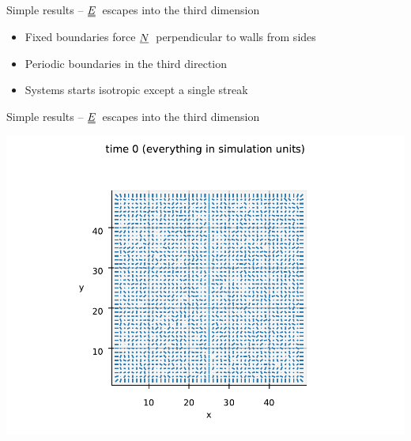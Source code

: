 \documentclass[10pt,mathserif]{beamer}
\newcommand{\suf}[2]{\stackunder[0.5pt]{\stackunder[1pt]{\ensuremath{#1}}{\rule{\widthof{\ensuremath{#2}}*\real{0.9}}{.1ex}}}{}}
\newcommand{\duf}[2]{\stackunder[0.5pt]{\stackunder[0.8pt]{\stackunder[1pt]{\ensuremath{#1}}{\rule{\widthof{\ensuremath{#2}}*\real{0.9}}{.1ex}}}{\rule{\widthof{\ensuremath{#2}}*\real{0.9}}{.1ex}}}{}}
\newcommand{\su}[1]{\suf{#1}{#1}}
\newcommand{\du}[1]{\duf{#1}{#1}}
\newcommand{\NN}{\ensuremath{\su{N}}}
\newcommand{\EE}{\ensuremath{\du{E}}}
\begin{document}
\begin{frame}[fragile]{Simple results -- \EE\ escapes into the third dimension}
    \newrefsection
    \begin{itemize}
        \item Fixed boundaries force \NN\ perpendicular to walls from sides
        \item Periodic boundaries in the third direction
        \item Systems starts isotropic except a single streak
    \end{itemize}
\end{frame}

\begin{frame}[fragile]{Simple results -- \EE\ escapes into the third dimension}
    \newrefsection
    \begin{center}
        \includegraphics[width=\textwidth]{figures/prelim0.pdf}
    \end{center}
\end{frame}
\end{document}
